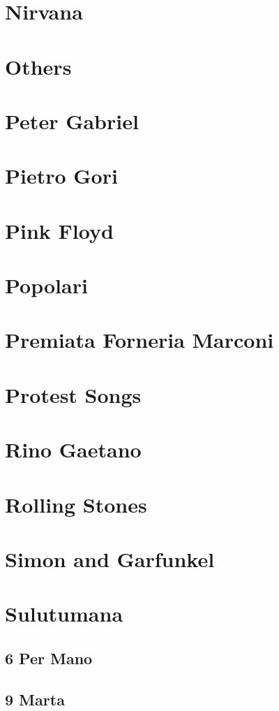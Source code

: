 \chapter{Nirvana}

\chapter{Others}

\chapter{Peter Gabriel}

\chapter{Pietro Gori}

\chapter{Pink Floyd}

\chapter{Popolari}

\chapter{Premiata Forneria Marconi}

\chapter{Protest Songs}

\chapter{Rino Gaetano}

\chapter{Rolling Stones}

\chapter{Simon and Garfunkel}

\chapter{Sulutumana}
\section{6 Per Mano}
\section{9 Marta}


